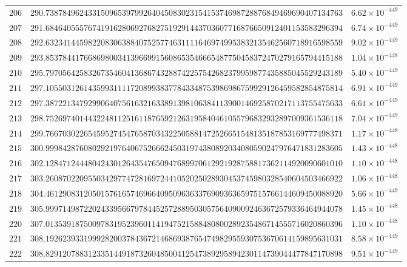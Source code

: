 \documentclass[12pt,reqno]{amsart}
\theoremstyle{remark}
\begin{document}
\begin{longtable}{clc}
$206$ & $290.7387849624331509653979926404508302315415374698728876849469690407134763$ & $6.62\times 10^{-449}$ \\
$207$ & $291.6846405557674191628069276827519291443703607716876650912401153583296394$ & $6.74\times 10^{-449}$ \\
$208$ & $292.6323414459822083063884075257746311116469749953832135462560718916598559$ & $9.02\times 10^{-449}$ \\
$209$ & $293.8537844176686980034139669915608653546665487750458372470279165794415188$ & $1.04\times 10^{-448}$ \\
$210$ & $295.7970564258326735460413686743288742257542682379959877435885045529243189$ & $5.40\times 10^{-449}$ \\
$211$ & $297.1055031261435993111172089938377843348753986986759929126459582854875814$ & $6.91\times 10^{-449}$ \\
$212$ & $297.3872213479299064075616321633891398106384113900146925870217113755475633$ & $6.61\times 10^{-449}$ \\
$213$ & $298.7526974014432248112516118765921263195840461055796832932897009361536118$ & $7.04\times 10^{-449}$ \\
$214$ & $299.7667030226545952745476587034322505881472526651548135187853169777498371$ & $1.17\times 10^{-448}$ \\
$215$ & $300.9998428760802921976406752666245031974380892034080590247976471831283605$ & $1.43\times 10^{-448}$ \\
$216$ & $302.1284712444804243012643547650947689970612921928758817362114920090601010$ & $1.10\times 10^{-448}$ \\
$217$ & $303.2608702209550342977472816972441052025028930453745980328540604503466922$ & $1.06\times 10^{-448}$ \\
$218$ & $304.4612908312050157616574696640950963633769093636597515766144609450088920$ & $5.66\times 10^{-449}$ \\
$219$ & $305.9997149872202433956679784452572889503057564090092463672579336464944078$ & $1.45\times 10^{-448}$ \\
$220$ & $307.0135391875009783195239601141947521588480800289235486714555716020860396$ & $1.10\times 10^{-448}$ \\
$221$ & $308.1926239331999282003784367214686938765474982955930753670614159895631031$ & $8.58\times 10^{-449}$ \\
$222$ & $308.8291207883123351449187326048500412547389295894230114739044477847170898$ & $9.51\times 10^{-449}$ \\

\end{longtable}
\end{document}
